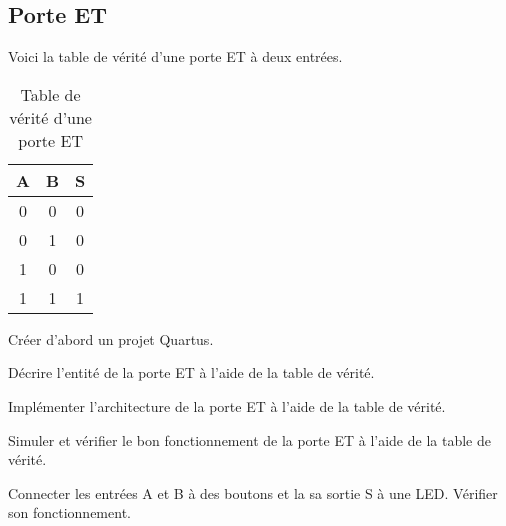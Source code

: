 \subsection{Porte ET}
Voici la table de vérité d'une porte ET à deux entrées.
\begin{table}[ht]
    \centering
    \begin{tabular}{c c|c} 
        A & B & S \\
        \hline
        0 & 0 & 0 \\
        0 & 1 & 0 \\
        1 & 0 & 0 \\
        1 & 1 & 1
    \end{tabular}
    \caption{Table de vérité d'une porte ET}
\end{table}

Créer d'abord un projet Quartus.

\medskip

Décrire l'entité de la porte ET à l'aide de la table de vérité.

\medskip

Implémenter l'architecture de la porte ET à l'aide de la table de vérité.

\medskip

Simuler et vérifier le bon fonctionnement de la porte ET à l'aide de la table de vérité.

\medskip

Connecter les entrées A et B à des boutons et la sa sortie S à une LED. Vérifier son fonctionnement.
